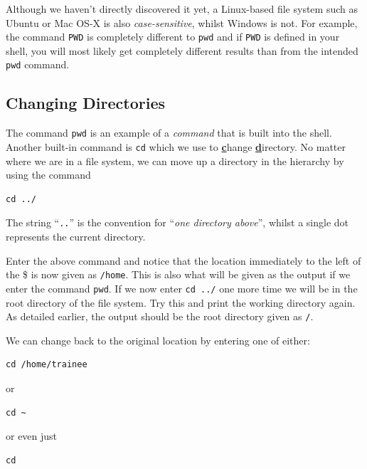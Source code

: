 \documentclass[a4paper,12pt,twoside]{memoir}
\begin{document}
\begin{warning}
Although we haven't directly discovered it yet, a Linux-based file system such as Ubuntu or Mac OS-X is also \textit{case-sensitive}, whilst Windows is not.
For example, the command \texttt{PWD} is completely different to \texttt{pwd} and if \texttt{PWD} is defined in your shell, you will most likely get completely different results than from the intended \texttt{pwd} command.
\end{warning}

\subsection{Changing Directories}
\begin{information}
The command \texttt{pwd} is an example of a \textit{command} that is built into the shell.
Another built-in command is \texttt{cd} which we use to \textbf{\underline{c}}hange \textbf{\underline{d}}irectory.
No matter where we are in a file system, we can move up a directory in the hierarchy by using the command 
\begin{lstlisting}
cd ../
\end{lstlisting}
The string ``\texttt{..}'' is the convention for ``\textit{one directory above}'', whilst a single dot represents the current directory. \\
\end{information}

\begin{steps}
Enter the above command and notice that the location immediately to the left of the \$ is now given as \texttt{/home}.
This is also what will be given as the output if we enter the command \texttt{pwd}.
If we now enter \texttt{cd ../} one more time we will be in the root directory of the file system.
Try this and print the working directory again.
As detailed earlier, the output should be the root directory given as \texttt{/}. \\
\end{steps}

We can change back to the original location by entering one of either:
\begin{steps}
\begin{lstlisting}
cd /home/trainee
\end{lstlisting}
or \\
\begin{lstlisting}
cd ~ 
\end{lstlisting}
or even just \\
\begin{lstlisting}
cd
\end{lstlisting}
\end{steps}
\end{document}

